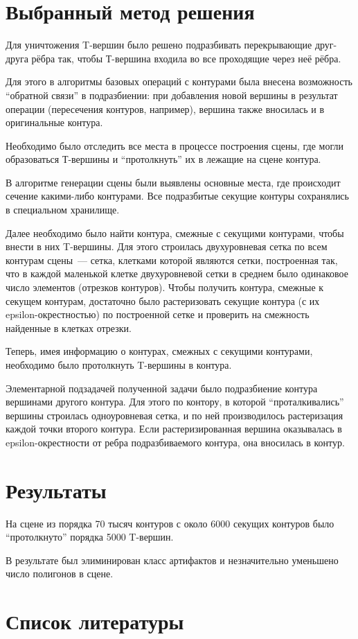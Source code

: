 \documentclass[a4paper,10pt,titlepage]{report}
\begin{document}
\section*{Выбранный метод решения}
Для уничтожения T-вершин было решено подразбивать перекрывающие друг-друга рёбра так, 
чтобы Т-вершина входила во все проходящие через неё рёбра.

Для этого в алгоритмы базовых операций с контурами была внесена возможность ``обратной связи'' в подразбиении: 
при добавления новой вершины в результат операции (пересечения контуров, например), 
вершина также вносилась и в оригинальные контура.

Необходимо было отследить все места в процессе построения сцены, 
где могли образоваться Т-вершины и ``протолкнуть'' их в лежащие на сцене контура.

В алгоритме генерации сцены были выявлены основные места, 
где происходит сечение какими-либо контурами.
Все подразбитые секущие контуры сохранялись в специальном хранилище.

Далее необходимо было найти контура, смежные с секущими контурами, 
чтобы внести в них T-вершины.
Для этого строилась двухуровневая сетка по всем контурам сцены~---
сетка, клетками которой являются сетки, построенная так, 
что в каждой маленькой клетке двухуровневой сетки в среднем было одинаковое число элементов 
(отрезков контуров).
Чтобы получить контура, смежные к секущем контурам, достаточно было растеризовать секущие 
контура (с их epsilon-окрестностью) по построенной сетке и проверить на смежность 
найденные в клетках отрезки.

Теперь, имея информацию о контурах, смежных с секущими контурами, 
необходимо было протолкнуть T-вершины в контура.

Элементарной подзадачей полученной задачи было подразбиение контура вершинами другого контура.
Для этого по контору, в которой ``проталкивались'' вершины строилась одноуровневая сетка, 
и по ней производилось растеризация каждой точки второго контура. 
Если растеризированная вершина оказывалась в epsilon-окрестности от ребра подразбиваемого контура, 
она вносилась в контур.

\section*{Результаты}
На сцене из порядка 70 тысяч контуров с около 6000 секущих контуров было ``протолкнуто'' порядка 5000 T-вершин.

В результате был элиминирован класс артифактов и незначительно уменьшено число полигонов в сцене.

\section*{Список литературы}
\end{document}

